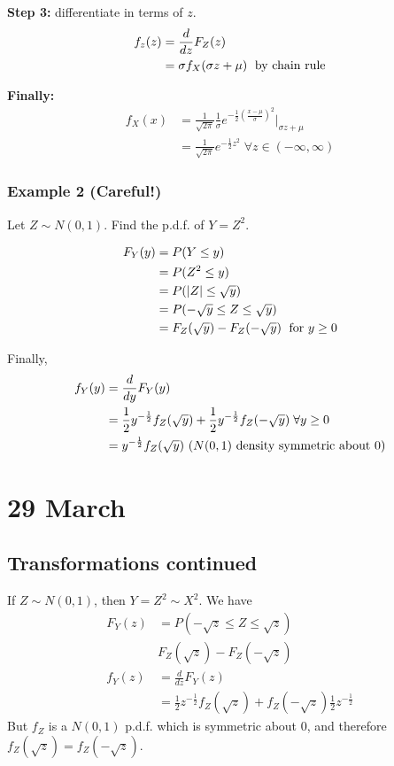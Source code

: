 \documentclass[12pt]{article}
\begin{document}
\textbf{Step 3:} differentiate in terms of $z$.
\begin{align*}
    f_z (z) &= \frac{d}{dz} F_Z (z) \\
        &= \sigma f_X (\sigma z + \mu) \; \textnormal{ by chain rule}
\end{align*}

\textbf{Finally:} 
\begin{align*}
    f_X (x) &= \frac{1}{\sqrt{2\pi}} \frac{1}{\sigma} e^{-\frac{1}{2} (\frac{x-\mu}{\sigma})^2} \Big|_{\sigma z + \mu} \\
        &= \frac{1}{\sqrt{2\pi}} e^{-\frac{1}{2} z^2} \; \forall z \in (-\infty, \infty)
\end{align*}

\subsubsection{Example 2 (Careful!)}
Let $Z \sim N(0,1)$. Find the p.d.f. of $Y=Z^2$.

\begin{align*}
    F_Y (y) &= P(Y \leq y) \\
        &= P(Z^2 \leq y) \\
        &= P(|Z| \leq \sqrt{y}) \\
        &= P(-\sqrt{y} \leq Z \leq \sqrt{y}) \\
        &= F_Z (\sqrt{y}) - F_Z (-\sqrt{y}) \; \textnormal{ for } y \geq 0
\end{align*}

Finally,
\begin{align*}
    f_Y (y) &= \frac{d}{dy} F_Y (y) \\
        &= \frac{1}{2} y^{-\frac{1}{2}} f_Z (\sqrt{y}) + \frac{1}{2} y^{-\frac{1}{2}} f_Z (-\sqrt{y}) \; \forall y \geq 0 \\
        &=y^{-\frac{1}{2}}  f_Z (\sqrt{y}) \textnormal{ ($N(0,1)$ density symmetric about 0)}
\end{align*}

\section{29 March}
\subsection{Transformations continued}
If $Z \sim N(0,1)$, then $Y = Z^2 \sim X^2$. We have
\begin{align*}
    F_Y (z) &= P(-\sqrt{z} \leq Z \leq \sqrt{z}) \\
        & F_Z (\sqrt{z}) - F_Z (-\sqrt{z}) \\
    f_Y (z) &= \frac{d}{dz} F_Y (z) \\
        &= \frac{1}{2} z^{-\frac{1}{2}} f_Z (\sqrt{z}) + f_Z (-\sqrt{z}) \frac{1}{2} z^{-\frac{1}{2}}
\end{align*}
But $f_Z$ is a $N(0,1)$ p.d.f. which is symmetric about 0, and therefore $f_Z (\sqrt{z}) = f_Z (-\sqrt{z})$.
\end{document}

